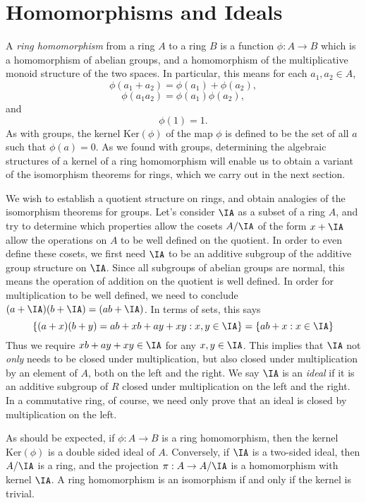 \section{Homomorphisms and Ideals}

A \emph{ring homomorphism} from a ring $A$ to a ring $B$ is a function $\phi: A \to B$ which is a homomorphism of abelian groups, and a homomorphism of the multiplicative monoid structure of the two spaces. In particular, this means for each $a_1,a_2 \in A$,
%
\[ \phi(a_1 + a_2) = \phi(a_1) + \phi(a_2), \]
%
\[ \phi(a_1a_2) = \phi(a_1) \phi(a_2), \]
%
and
%
\[ \phi(1) = 1. \]
%
As with groups, the kernel $\text{Ker}(\phi)$ of the map $\phi$ is defined to be the set of all $a$ such that $\phi(a) = 0$. As we found with groups, determining the algebraic structures of a kernel of a ring homomorphism will enable us to obtain a variant of the isomorphism theorems for rings, which we carry out in the next section.

We wish to establish a quotient structure on rings, and obtain analogies of the isomorphism theorems for groups. Let's consider $\IA$ as a subset of a ring $A$, and try to determine which properties allow the cosets $A/\IA$ of the form $x + \IA$ allow the operations on $A$ to be well defined on the quotient. In order to even define these cosets, we first need $\IA$ to be an additive subgroup of the additive group structure on $\IA$. Since all subgroups of abelian groups are normal, this means the operation of addition on the quotient is well defined. In order for multiplication to be well defined, we need to conclude $(a + \IA)(b + \IA) = (ab + \IA)$. In terms of sets, this says
%
\[ \{ (a + x)(b + y) = ab + xb + ay + xy : x,y \in \IA \} = \{ ab + x : x \in \IA \} \]
%
Thus we require $xb + ay + xy \in \IA$ for any $x,y \in \IA$. This implies that $\IA$ not {\it only} needs to be closed under multiplication, but also closed under multiplication by an element of $A$, both on the left and the right. We say $\IA$ is an \emph{ideal} if it is an additive subgroup of $R$ closed under multiplication on the left and the right. In a commutative ring, of course, we need only prove that an ideal is closed by multiplication on the left.

\begin{example}
    As should be expected, if $\phi: A \to B$ is a ring homomorphism, then the kernel $\text{Ker}(\phi)$ is a double sided ideal of $A$. Conversely, if $\IA$ is a two-sided ideal, then $A/\IA$ is a ring, and the projection $\pi: A \to A/\IA$ is a homomorphism with kernel $\IA$.  A ring homomorphism is an isomorphism if and only if the kernel is trivial.
\end{example}

